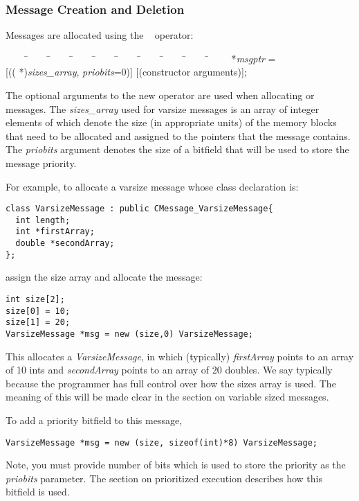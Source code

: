 \subsubsection{Message Creation and Deletion}
\label{memory allocation}

Messages are allocated using the \CC\ 
operator:

\begin{tabbing}
~~~~ \=~~~~ \=~~~~ \=~~~~ \=~~~~ \=~~~~ \=~~~~ \=~~~~ \=~~~~ \=~~~~ \kill
\>  *{\it msgptr} = \\
\> \>  [(( *){\it sizes\_array},  {\it priobits}=0)] 
[(constructor arguments)]; \\
\end{tabbing}

The optional arguments to the new operator are used when allocating 
 or  messages. The {\it sizes\_array} 
used for varsize messages is an 
array of integer elements of which denote the size (in appropriate
units) of the memory blocks that need to be allocated and assigned to the
pointers that the message contains. The {\it priobits} argument 
denotes the size of a bitfield that will be used to store the message 
priority.   

For example, to allocate a varsize message whose 
class declaration is:

\begin{verbatim}
class VarsizeMessage : public CMessage_VarsizeMessage{
  int length;
  int *firstArray;
  double *secondArray;
};
\end{verbatim}

assign the size array and allocate the message:
\begin{verbatim}
int size[2];
size[0] = 10;
size[1] = 20;
VarsizeMessage *msg = new (size,0) VarsizeMessage;
\end{verbatim}

This allocates a {\it VarsizeMessage}, in which (typically) {\it firstArray}
points to an array of 10 ints and {\it secondArray} points to an array
of 20 doubles. We say typically because the programmer has full control over 
how the sizes array is used. The meaning of this will be made clear in the 
section on variable sized messages.


To add a priority bitfield to this message, 
\begin{verbatim}
VarsizeMessage *msg = new (size, sizeof(int)*8) VarsizeMessage;
\end{verbatim}
Note, you must provide number of bits which is used to store the priority as 
the {\it priobits} parameter. The section on prioritized execution describes
how this bitfield is used.

